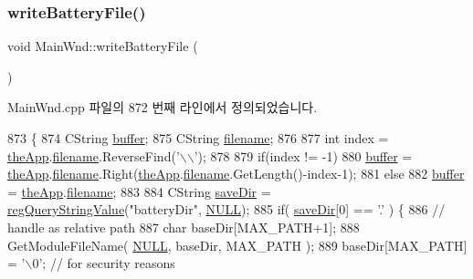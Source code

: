 \subsubsection{\texorpdfstring{write\+Battery\+File()}{writeBatteryFile()}}
{\footnotesize\ttfamily void Main\+Wnd\+::write\+Battery\+File (\begin{DoxyParamCaption}{ }\end{DoxyParamCaption})}



Main\+Wnd.\+cpp 파일의 872 번째 라인에서 정의되었습니다.


\begin{DoxyCode}
873 \{
874   CString \mbox{\hyperlink{_g_b_a_8cpp_a28d4d3d8445e73a696b2d6f7eadabd96}{buffer}};
875   CString \mbox{\hyperlink{_s_d_l_8cpp_ac33a174c39700095ca0f892624d85a3f}{filename}};
876 
877   \textcolor{keywordtype}{int} index = \mbox{\hyperlink{_v_b_a_8cpp_a8095a9d06b37a7efe3723f3218ad8fb3}{theApp}}.\mbox{\hyperlink{class_v_b_a_a66eee6b61ec8bee20f21164cb0c37d2d}{filename}}.ReverseFind(\textcolor{charliteral}{'\(\backslash\)\(\backslash\)'});
878 
879   \textcolor{keywordflow}{if}(index != -1)
880     \mbox{\hyperlink{_g_b_a_8cpp_a28d4d3d8445e73a696b2d6f7eadabd96}{buffer}} = \mbox{\hyperlink{_v_b_a_8cpp_a8095a9d06b37a7efe3723f3218ad8fb3}{theApp}}.\mbox{\hyperlink{class_v_b_a_a66eee6b61ec8bee20f21164cb0c37d2d}{filename}}.Right(\mbox{\hyperlink{_v_b_a_8cpp_a8095a9d06b37a7efe3723f3218ad8fb3}{theApp}}.\mbox{\hyperlink{class_v_b_a_a66eee6b61ec8bee20f21164cb0c37d2d}{filename}}.GetLength()-index-1);
881   \textcolor{keywordflow}{else}
882     \mbox{\hyperlink{_g_b_a_8cpp_a28d4d3d8445e73a696b2d6f7eadabd96}{buffer}} = \mbox{\hyperlink{_v_b_a_8cpp_a8095a9d06b37a7efe3723f3218ad8fb3}{theApp}}.\mbox{\hyperlink{class_v_b_a_a66eee6b61ec8bee20f21164cb0c37d2d}{filename}};
883 
884   CString \mbox{\hyperlink{_s_d_l_8cpp_a7b37d94db9ce90c610565cb80ff50444}{saveDir}} = \mbox{\hyperlink{_reg_8cpp_a618826d274df0d9c19fab2ff28bd9008}{regQueryStringValue}}(\textcolor{stringliteral}{"batteryDir"}, 
      \mbox{\hyperlink{getopt1_8c_a070d2ce7b6bb7e5c05602aa8c308d0c4}{NULL}});
885   \textcolor{keywordflow}{if}( \mbox{\hyperlink{_s_d_l_8cpp_a7b37d94db9ce90c610565cb80ff50444}{saveDir}}[0] == \textcolor{charliteral}{'.'} ) \{
886       \textcolor{comment}{// handle as relative path}
887       \textcolor{keywordtype}{char} baseDir[MAX\_PATH+1];
888       GetModuleFileName( \mbox{\hyperlink{getopt1_8c_a070d2ce7b6bb7e5c05602aa8c308d0c4}{NULL}}, baseDir, MAX\_PATH );
889       baseDir[MAX\_PATH] = \textcolor{charliteral}{'\(\backslash\)0'}; \textcolor{comment}{// for security reasons}

\end{DoxyCode}
